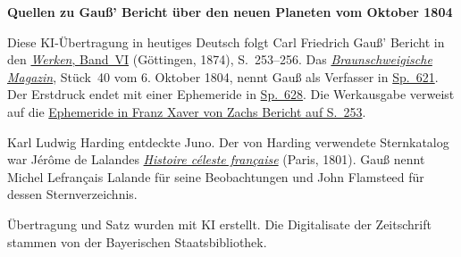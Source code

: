 \clearpage\thispagestyle{empty}
\begin{center}\textbf{Quellen zu Gauß’ Bericht über den neuen Planeten vom Oktober 1804}\end{center}
\noindent Diese KI-Übertragung in heutiges Deutsch folgt Carl Friedrich Gauß’ Bericht in den \href{https://gdz.sub.uni-goettingen.de/id/PPN236007467}{\textit{Werken}, Band~VI} (Göttingen, 1874), S.~253--256. Das \href{https://digipress.digitale-sammlungen.de/view/bsb10531607_00329_u001}{\textit{Braunschweigische Magazin}}, Stück~40 vom 6. Oktober 1804, nennt Gauß als Verfasser in \href{https://www.digitale-sammlungen.de/en/view/bsb10531607?page=329}{Sp.~621}. Der Erstdruck endet mit einer Ephemeride in \href{https://www.digitale-sammlungen.de/en/view/bsb10531607?page=332}{Sp.~628}. Die Werkausgabe verweist auf die \hyperlink{native-258}{Ephemeride in Franz Xaver von Zachs Bericht auf S.~253}.
\par\smallskip\noindent Karl Ludwig Harding entdeckte Juno. Der von Harding verwendete Sternkatalog war Jérôme de Lalandes \href{https://archive.org/download/histoireclestef00lalagoog/page/n12.jpg}{\textit{Histoire céleste française}} (Paris, 1801). Gauß nennt Michel Lefrançais Lalande für seine Beobachtungen und John Flamsteed für dessen Sternverzeichnis.
\par\smallskip\noindent Übertragung und Satz wurden mit KI erstellt. Die Digitalisate der Zeitschrift stammen von der Bayerischen Staatsbibliothek.
\clearpage
